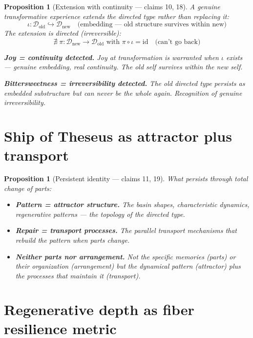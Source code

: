 \documentclass[11pt,a4paper]{article}
\newtheorem{proposition}[definition]{Proposition}
\begin{document}
\begin{proposition}[Extension with continuity --- claims 10, 18]
\label{prop:transformative}
A genuine transformative experience extends the directed type rather
than replacing it:
\[
  \iota: \mathcal{D}_{\text{old}} \hookrightarrow \mathcal{D}_{\text{new}}
  \quad \text{(embedding --- old structure survives within new)}
\]
The extension is directed (irreversible):
\[
  \nexists\; \pi: \mathcal{D}_{\text{new}} \to \mathcal{D}_{\text{old}}
  \text{ with } \pi \circ \iota = \text{id}
  \quad \text{(can't go back)}
\]

\textbf{Joy = continuity detected.} Joy at transformation is warranted
when $\iota$ exists --- genuine embedding, real continuity. The old self
survives within the new self.

\textbf{Bittersweetness = irreversibility detected.} The old directed
type persists as embedded substructure but can never be the whole again.
Recognition of genuine irreversibility.
\end{proposition}

\section{Ship of Theseus as attractor plus transport}

\begin{proposition}[Persistent identity --- claims 11, 19]
\label{prop:theseus}
What persists through total change of parts:
\begin{itemize}
  \item \textbf{Pattern = attractor structure.} The basin shapes,
    characteristic dynamics, regenerative patterns --- the topology
    of the directed type.
  \item \textbf{Repair = transport processes.} The parallel transport
    mechanisms that rebuild the pattern when parts change.
  \item \textbf{Neither parts nor arrangement.} Not the specific memories
    (parts) or their organization (arrangement) but the dynamical pattern
    (attractor) plus the processes that maintain it (transport).
\end{itemize}
\end{proposition}


\section{Regenerative depth as fiber resilience metric}
\label{sec:depth}
\end{document}
